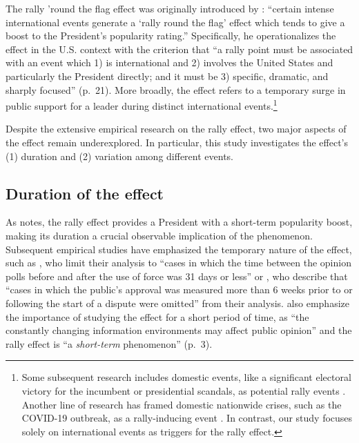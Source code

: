 \documentclass[letterpaper,12pt]{scrartcl}
\begin{document}
The rally 'round the flag effect was originally introduced by \citet[][p.~21]{Mueller1970APSR}: ``certain intense international events generate a `rally round the flag' effect which tends to give a boost to the President's popularity rating.'' Specifically, he operationalizes the effect in the U.S. context with the criterion that ``a rally point must be associated with an event which 1) is international and 2) involves the United States and particularly the President directly; and it must be 3) specific, dramatic, and sharply focused'' (p.~21).  More broadly, the effect refers to a temporary surge in public support for a leader during distinct international events.\footnote{Some subsequent research includes domestic events, like a significant electoral victory for the incumbent or presidential scandals, as potential rally events \citep[e.g.,][]{Newman2010ElectStud}. Another line of research has framed domestic nationwide crises, such as the COVID-19 outbreak, as a rally-inducing event \citep[e.g.,][]{Kritzinger2021WestEurPolit,Yam2020PNAS}. In contrast, our study focuses solely on international events as triggers for the rally effect.}

Despite the extensive empirical research on the rally effect, two major aspects of the effect remain underexplored. In particular, this study investigates the effect's (1) duration and (2) variation among different events.

\subsection*{Duration of the effect}

As \citet{Mueller1970APSR} notes, the rally effect provides a President with a short-term popularity boost, making its duration a crucial observable implication of the phenomenon. Subsequent empirical studies have emphasized the temporary nature of the effect, such as \citet[][p.~284]{Lian1993JCR}, who limit their analysis to ``cases in which the time between the opinion polls before and after the use of force was 31 days or less'' or \citet[][p.~670]{Baker2001JCR}, who describe that ``cases in which the public's approval was measured more than 6 weeks prior to or following the start of a dispute were omitted'' from their analysis. \citet{seo2023} also emphasize the importance of studying the effect for a short period of time, as ``the constantly changing information environments may affect public opinion'' and the rally effect is ``a \emph{short-term} phenomenon'' (p.~3).
\end{document}
